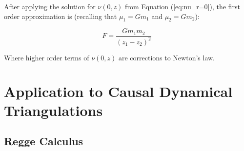 \documentclass{article}
\begin{document}
After applying the solution for $\nu(0,z)$ from Equation (\ref{eq:nu_r=0}), the first order approximation is (recalling that $\mu_{1}=Gm_{1}$ and $\mu_{2}=Gm_{2}$):

\begin{equation}
F=\frac{Gm_{1}m_{2}}{\left(z_{1}-z_{2}\right)^{2}}
\end{equation}

Where higher order terms of $\nu\left(0,z\right)$ are corrections to Newton's law.

\section{Application to Causal Dynamical Triangulations}

\subsection{Regge Calculus}



\end{document}
